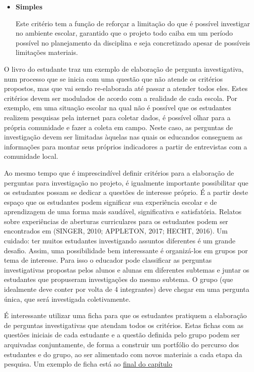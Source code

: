 \begin{paginatexto}
{\begin{itemize}
\item \textbf{Simples}

Este critério tem a função de reforçar a limitação do que é possível investigar no ambiente escolar, garantido que o projeto todo caiba em um período possível no planejamento da disciplina e seja concretizado apesar de possíveis limitações materiais.
\end{itemize}

O livro do estudante traz um exemplo de elaboração de pergunta investigativa, num processo que se inicia com uma questão que não atende os critérios propostos, mas que vai sendo re-elaborada até passar a atender todos eles. Estes critérios devem ser modulados de acordo com a realidade de cada escola. Por exemplo, em uma situação escolar na qual não é possível que os estudantes realizem pesquisas pela internet para coletar dados, é possível olhar para a própria comunidade e fazer a coleta em campo. Neste caso, as perguntas de investigação devem ser limitadas àquelas nas quais os educandos conseguem as informações para montar seus próprios indicadores a partir de entrevistas com a comunidade local.

Ao mesmo tempo que é imprescindível definir critérios para a elaboração de perguntas para investigação no projeto, é igualmente importante possibilitar que os estudantes possam se dedicar a questões de interesse próprio. É a partir deste espaço que os estudantes podem significar sua experiência escolar e de aprendizagem de uma forma mais saudável, significativa e satisfatória. Relatos sobre experiências de aberturas curriculares para os estudantes podem ser encontrados em (SINGER, 2010; APPLETON, 2017; HECHT, 2016).
Um cuidado: ter muitos estudantes investigando assuntos diferentes é um grande desafio. Assim, uma possibilidade bem interessante é organizá-los em grupos por tema de interesse. Para isso o educador pode classificar as perguntas investigativas propostas pelos alunos e alunas em diferentes subtemas e juntar os estudantes que propuseram investigações do mesmo subtema. O grupo (que idealmente deve conter por volta de 4 integrantes) deve chegar em uma pergunta única, que será investigada coletivamente.

É interessante utilizar uma ficha para que os estudantes pratiquem a elaboração de perguntas investigativas que atendam todos os critérios. Estas fichas com as questões iniciais de cada estudante e a questão definida pelo grupo podem ser arquivadas conjuntamente, de forma a construir um portfólio do percurso dos estudantes e do grupo, ao ser alimentado com novos materiais a cada etapa da pesquisa. Um exemplo de ficha está ao \hyperref[elaboracao-questoes]{final do capítulo}

}
\end{paginatexto}

